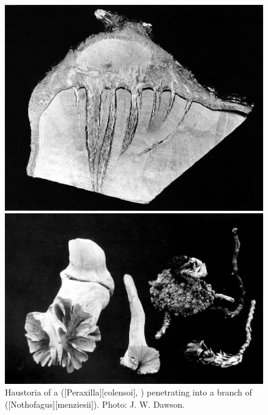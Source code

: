 \begin{figure}[!t]
	\begin{minipage}[t]{\textwidth}
		\begin{minipage}[t]{(\textwidth-\fgap) * \real{0.452}}
			\centering
			\includegraphics[width=\textwidth]{graphics/fig_057}
			\caption[Haustoria of a korukoru]{Haustoria of a  ([Peraxilla][colensoi], ) penetrating into a branch of  ([Nothofagus][menziesii]).
			Photo: J. W. Dawson.}%
			\label{fig:57mistletoe-haustori}
		\end{minipage}\hspace{\fgap}%
		\begin{minipage}[t]{(\textwidth-\fgap) * \real{0.548}}
			\centering
			\includegraphics[width=\textwidth]{graphics/fig_058}

\end{minipage}
\end{minipage}
\end{figure}

